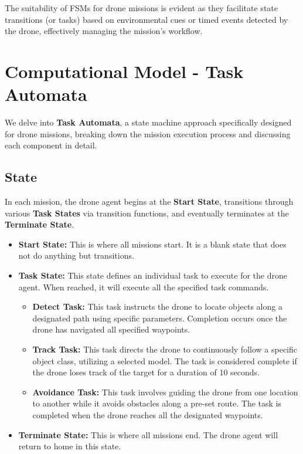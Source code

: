 The suitability of FSMs for drone missions is evident as they facilitate state transitions (or tasks) based on environmental cues or timed events detected by the drone, effectively managing the mission's workflow.

\section{Computational Model - Task Automata}
We delve into \textbf{Task Automata}, a state machine approach specifically designed for drone missions, breaking down the mission execution process and discussing each component in detail.



\subsection{State} In each mission, the drone agent begins at the \textbf{Start State}, transitions through various \textbf{Task States} via transition functions, and eventually terminates at the \textbf{Terminate State}.
\begin{itemize}
    \item \textbf{Start State:} This is where all missions start. It is a blank state that does not do anything but transitions.
    
    \item \textbf{Task State:}  This state defines an individual task to execute for the drone agent. When reached, it will execute all the specified task commands.
    \begin{itemize}

        \item \textbf{Detect Task:} This task instructs the drone to locate objects along a designated path using specific parameters. Completion occurs once the drone has navigated all specified waypoints.
        \item \textbf{Track Task:} This task directs the drone to continuously follow a specific object class, utilizing a selected model. The task is considered complete if the drone loses track of the target for a duration of 10 seconds.
        \item \textbf{Avoidance Task:} This task involves guiding the drone from one location to another while it avoids obstacles along a pre-set route. The task is completed when the drone reaches all the designated waypoints.

    \end{itemize}
    
    \item \textbf{Terminate State:} This is where all missions end. The drone agent will return to home in this state.
\end{itemize}



